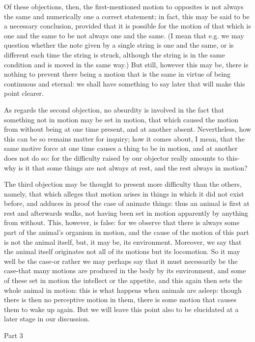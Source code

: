 Of these objections, then, the first-mentioned motion to opposites
is not always the same and numerically one a correct statement; in
fact, this may be said to be a necessary conclusion, provided that
it is possible for the motion of that which is one and the same to
be not always one and the same. (I mean that e.g. we may question
whether the note given by a single string is one and the same, or
is different each time the string is struck, although the string is
in the same condition and is moved in the same way.) But still, however
this may be, there is nothing to prevent there being a motion that
is the same in virtue of being continuous and eternal: we shall have
something to say later that will make this point clearer.

As regards the second objection, no absurdity is involved in the fact
that something not in motion may be set in motion, that which caused
the motion from without being at one time present, and at another
absent. Nevertheless, how this can be so remains matter for inquiry;
how it comes about, I mean, that the same motive force at one time
causes a thing to be in motion, and at another does not do so: for
the difficulty raised by our objector really amounts to this-why is
it that some things are not always at rest, and the rest always in
motion? 

The third objection may be thought to present more difficulty than
the others, namely, that which alleges that motion arises in things
in which it did not exist before, and adduces in proof the case of
animate things: thus an animal is first at rest and afterwards walks,
not having been set in motion apparently by anything from without.
This, however, is false: for we observe that there is always some
part of the animal's organism in motion, and the cause of the motion
of this part is not the animal itself, but, it may be, its environment.
Moreover, we say that the animal itself originates not all of its
motions but its locomotion. So it may well be the case-or rather we
may perhaps say that it must necessarily be the case-that many motions
are produced in the body by its environment, and some of these set
in motion the intellect or the appetite, and this again then sets
the whole animal in motion: this is what happens when animals are
asleep: though there is then no perceptive motion in them, there is
some motion that causes them to wake up again. But we will leave this
point also to be elucidated at a later stage in our discussion.

Part 3

